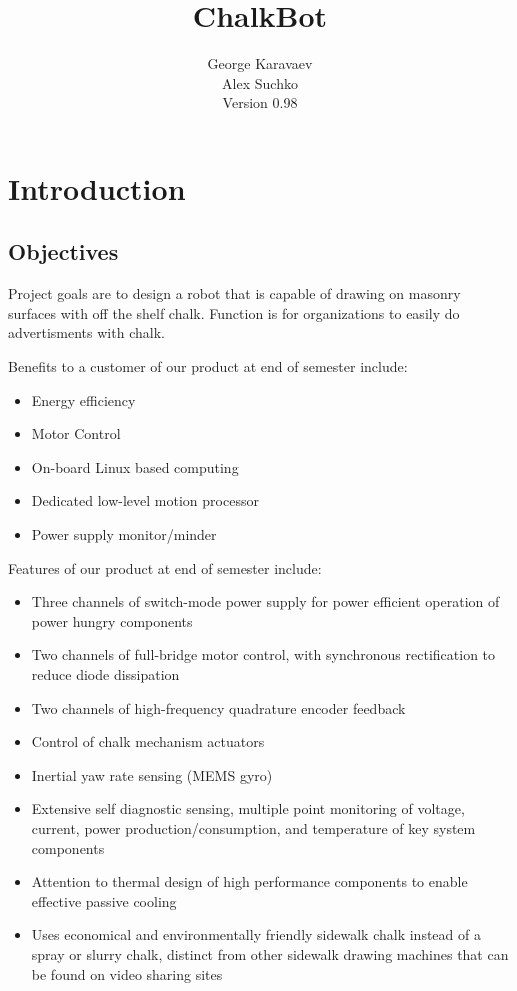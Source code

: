 \documentclass[12pt]{article}
\title{ChalkBot}
\author{George Karavaev\\ Alex Suchko\\ \normalsize Version 0.98}
\begin{document}
  \maketitle 
 \newpage
 \tableofcontents
 \newpage
 \section{Introduction}
 \subsection{Objectives}
 Project goals are to design a robot that is capable of drawing on masonry surfaces with off the shelf chalk. Function is for organizations to easily do advertisments with chalk.
 
 Benefits to a customer of our product at end of semester include:
 \begin{itemize}
  \item Energy efficiency
  \item Motor Control
  \item On-board Linux based computing
  \item Dedicated low-level motion processor
  \item Power supply monitor/minder
\end{itemize}
Features of our product at end of semester include:
   \begin{itemize}
  \item Three channels of switch-mode power supply for power efficient operation of power hungry components
  \item Two channels of full-bridge motor control, with synchronous rectification to reduce diode dissipation
  \item Two channels of high-frequency quadrature encoder feedback
  \item Control of chalk mechanism actuators
  \item Inertial yaw rate sensing (MEMS gyro)
  \item Extensive self diagnostic sensing, multiple point monitoring of voltage, current, power production/consumption, and temperature of key system components
  \item Attention to thermal design of high performance components to enable effective passive cooling
  \item Uses economical and environmentally friendly sidewalk chalk instead of a spray or slurry chalk, distinct from other sidewalk drawing machines that can be found on video sharing sites
\end{itemize}
  
\end{document}
